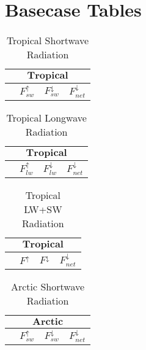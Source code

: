\documentclass[10pt,twocolumn]{article}
\begin{document}
\section{Basecase Tables}

\begin{table}[h]
	\centering
	\caption{Tropical Shortwave Radiation}
	\label{tab:tsr}
	\begin{tabular}{lccc}
		\toprule
		\multicolumn{4}{c}{$\textbf{Tropical}$}\\
		\midrule
		& $F^\uparrow_{sw}$ & $F^\downarrow_{sw}$ & $F^\downarrow_{net}$\\
		\midrule
		
		\bottomrule
	\end{tabular}
\end{table}


\begin{table}[h]
	\centering
	\caption{Tropical Longwave Radiation}
	\label{tab:tlr}
	\begin{tabular}{lccc}
		\toprule
		\multicolumn{4}{c}{$\textbf{Tropical}$}\\
		\midrule
		& $F^\uparrow_{lw}$ & $F^\downarrow_{lw}$ & $F^\downarrow_{net}$\\
		\midrule
		
		\bottomrule
	\end{tabular}
	
\end{table}

\begin{table}[h]
	\centering
	\caption{Tropical LW+SW Radiation}
	\label{tab:tcr}
	\begin{tabular}{lccc}
		\toprule
		\multicolumn{4}{c}{$\textbf{Tropical}$}\\
		\midrule
		& $F^\uparrow$ & $F^\downarrow$ & $F^\downarrow_{net}$\\
		\midrule
		
		\bottomrule
	\end{tabular}
	
\end{table}


\begin{table}[h]
	\centering
	\caption{Arctic Shortwave Radiation}
	\label{tab:asr}
	\begin{tabular}{lccc}
		\toprule
		\multicolumn{4}{c}{$\textbf{Arctic}$}\\
		\midrule
		& $F^\uparrow_{sw}$ & $F^\downarrow_{sw}$ & $F^\downarrow_{net}$\\
		\midrule
		
		\bottomrule
	\end{tabular}
\end{table}
\end{document}
